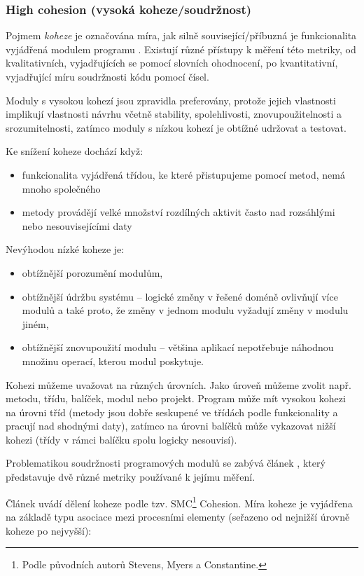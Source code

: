 \subsubsection{High cohesion (vysoká koheze/soudržnost)}
Pojmem \emph{koheze} je označována míra, jak silně související/příbuzná je funkcionalita vyjádřená modulem programu \cite{wiki:cohesion}. Existují různé přístupy k měření této metriky, od kvalitativních, vyjadřujících se pomocí slovních ohodnocení, po kvantitativní, vyjadřující míru soudržnosti kódu pomocí čísel.

Moduly s vysokou kohezí jsou zpravidla preferovány, protože jejich vlastnosti implikují  vlastnosti návrhu včetně stability, spolehlivosti, znovupoužitelnosti a srozumitelnosti, zatímco moduly s nízkou kohezí je obtížné udržovat a testovat.

Ke snížení koheze dochází když:
\begin{itemize}
\item funkcionalita vyjádřená třídou, ke které přistupujeme pomocí metod, nemá mnoho společného
\item metody provádějí velké množství rozdílných aktivit často nad rozsáhlými nebo nesouvisejícími daty
\end{itemize}

Nevýhodou nízké koheze je:
\begin{itemize}
\item obtížnější porozumění modulům,
\item obtížnější údržbu systému -- logické změny v řešené doméně ovlivňují více modulů a také proto, že změny v jednom modulu vyžadují změny v modulu jiném,
\item obtížnější znovupoužití modulu -- většina aplikací nepotřebuje náhodnou množinu operací, kterou modul poskytuje.
\end{itemize}

Kohezi můžeme uvažovat na různých úrovních. Jako úroveň můžeme zvolit např. metodu, třídu, balíček, modul nebo projekt. Program může mít vysokou kohezi na úrovni tříd (metody jsou dobře seskupené ve třídách podle funkcionality a pracují nad shodnými daty), zatímco na úrovni balíčků může vykazovat nižší kohezi (třídy v rámci balíčku spolu logicky nesouvisí).

Problematikou soudržnosti programových modulů se zabývá článek \cite{Kang:1996:DCM:872750.873361}, který představuje dvě různé metriky používané k jejímu měření.

Článek \cite{ISI:000079726000029} uvádí dělení koheze podle tzv. SMC\footnote{Podle původních autorů Stevens, Myers a Constantine.} Cohesion. Míra koheze je vyjádřena na základě typu asociace mezi procesními elementy (seřazeno od nejnižší úrovně koheze po nejvyšší):

